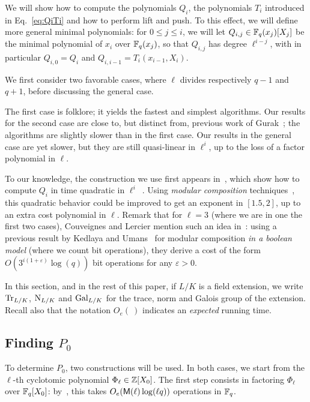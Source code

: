 \documentclass{sig-alternate}
\newcommand{\Cyc}{\Phi}  %
\begin{document}
We will show how to compute the polynomials $Q_i$, the polynomials
$T_i$ introduced in Eq.~\eqref{eq:QiTi} and how to perform lift and
push.  To this effect, we will define more general minimal
polynomials: for $0 \le j \le i$, we will let $Q_{i,j} \in
\mathbb{F}_q(x_j)[X_j]$ be the minimal polynomial of $x_i$ over $\mathbb{F}_q(x_j)$,
so that $Q_{i,j}$ has degree $\ell^{i-j}$, with in particular
$Q_{i,0}=Q_i$ and $Q_{i,i-1}=T_i(x_{i-1},X_i)$.

We first consider two favorable cases, where $\ell$ divides
respectively $q-1$ and $q+1$, before discussing the general case.

The first case is folklore; it yields the fastest and simplest
algorithms. Our results for the second case are close to, but distinct
from, previous work of Gurak~\cite{gurak06}; the algorithms are
slightly slower than in the first case. Our results in the general
case are yet slower, but they are still quasi-linear in $\ell^i$, up
to the loss of a factor polynomial in $\ell$. 

To our knowledge, the construction we use first appears
in~\cite{Shoup90,shoup94}, which show how to compute $Q_i$ in time
quadratic in $\ell^i$~\cite[Th.~11]{shoup94}.  Using {\em modular
  composition} techniques~\cite[Ch.~12]{vzGG}, this quadratic behavior
could be improved to get an exponent in $[1.5, 2]$, up to an extra
cost polynomial in $\ell$.  Remark that for $\ell=3$ (where we are in
one the first two cases), Couveignes and Lercier mention such an idea
in~\cite[\S~2.4]{couveignes+lercier11}: using a previous result by
Kedlaya and Umans~\cite{KeUm11} for modular composition {\em in a
  boolean model} (where we count bit operations), they derive a cost
of the form $O(3^{i(1+\varepsilon)} \log(q))$ bit operations for any
$\varepsilon > 0$.

In this section, and in the rest of this paper, if $L/K$ is a field
extension, we write $\operatorname{Tr}_{L/K}$, $\operatorname{N}_{L/K}$ and $\operatorname{Gal}_{L/K}$ for
the trace, norm and Galois group of the extension. Recall also that
the notation $O_e(\ )$ indicates an {\em expected} running time.


\subsection{Finding $P_0$}

To determine $P_0$, two constructions will be used. In both cases, we
start from the $\ell$-th cyclotomic polynomial $\Cyc_\ell \in
\Z[X_0]$. The first step consists in factoring $\Cyc_\ell$ over
$\mathbb{F}_q[X_0]$: by~\cite[Th.~9]{shoup94}, this takes
$O_e(\mathsf{M}(\ell)\log(\ell q))$ operations in $\mathbb{F}_q$.
\end{document}

